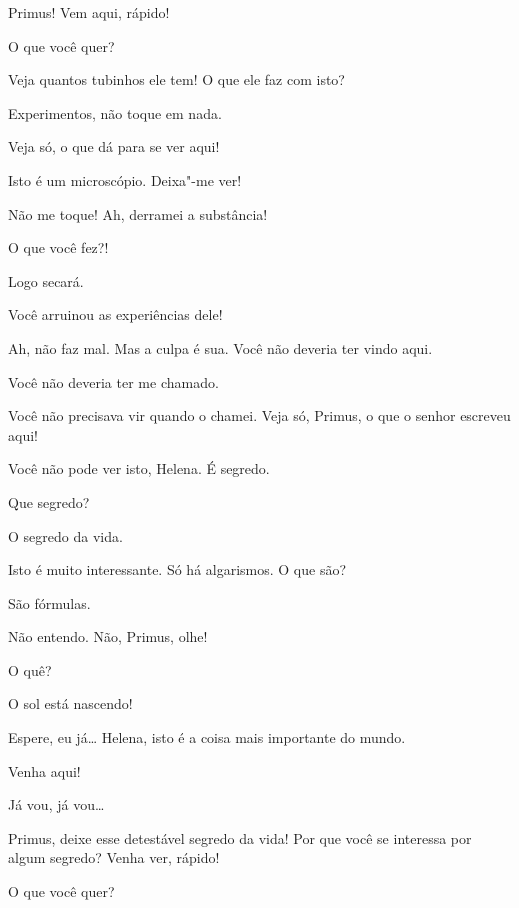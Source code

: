 
 Primus! Vem aqui, rápido!

  O que você quer?

 Veja quantos tubinhos ele tem! O que ele faz com isto?

 Experimentos, não toque em nada.

  Veja só, o que dá para se ver aqui!

 Isto é um microscópio. Deixa"-me ver!

 Não me toque!  Ah, derramei a substância!

 O que você fez?!

 Logo secará.

 Você arruinou as experiências dele!

 Ah, não faz mal. Mas a culpa é sua. Você não deveria ter vindo aqui.

 Você não deveria ter me chamado.

 Você não precisava vir quando o chamei. Veja só, Primus, o que o
senhor escreveu aqui!

 Você não pode ver isto, Helena. É segredo.

 Que segredo?

 O segredo da vida.

 Isto é muito interessante. Só há algarismos. O que são?

 São fórmulas.

 Não entendo.  Não, Primus, olhe!

 O quê?

 O sol está nascendo!

 Espere, eu já\ldots{}  Helena, isto é a coisa mais importante
do mundo.

 Venha aqui!

 Já vou, já vou\ldots{}

 Primus, deixe esse detestável segredo da vida! Por que você se
interessa por algum segredo? Venha ver, rápido!

  O que você quer?

